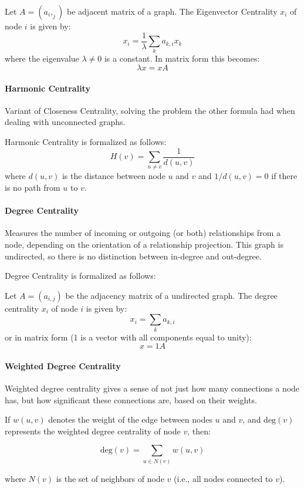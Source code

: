 \documentclass[10pt,twocolumn,letterpaper]{article}
\begin{document}
Let $A=(a_i,_j)$ be adjacent matrix of a graph. The Eigenvector Centrality $x_i$ of node $i$ is given by:
$$
x_{i}=\frac{1}{\lambda} \sum_{k} a_{k, i} x_{k}
$$
where the eigenvalue $\lambda \neq 0$ is a constant. In matrix form this becomes:
$$
\lambda x=x A
$$

\paragraph{Harmonic Centrality}

Variant of Closeness Centrality, solving the problem the other formula had when dealing with unconnected graphs.

Harmonic Centrality is formalized as follows:
$$
H(v)=\sum_{u \neq v} \frac{1}{d(u, v)}
$$
where $d(u, v)$ is the distance between node $u$ and $v$ and $1 / d(u, v)=0$ if there is no path from $u$ to $v$.

\paragraph{Degree Centrality}

Measures the number of incoming or outgoing (or both) relationships from a node, depending on the orientation of a relationship projection. This graph is undirected, so there is no distinction between in-degree and out-degree.

Degree Centrality is formalized as follows:

Let $A=\left(a_{i, j}\right)$ be the adjacency matrix of a undirected graph. The degree centrality $x_{i}$ of node $i$ is given by:
$$
x_{i}=\sum_{k} a_{k, i}
$$
or in matrix form (1 is a vector with all components equal to unity):
$$
x=1 A
$$

\paragraph{Weighted Degree Centrality}

Weighted degree centrality gives a sense of not just how many connections a node has, but how significant these connections are, based on their weights.

If \( w(u, v) \) denotes the weight of the edge between nodes \( u \) and \( v \), and \( \text{deg}(v) \) represents the weighted degree centrality of node \( v \), then:

\[
\text{deg}(v) = \sum_{u \in N(v)} w(u, v)
\]

where \( N(v) \) is the set of neighbors of node \( v \) (i.e., all nodes connected to \( v \)).
\end{document}
